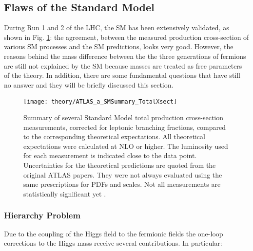 		\subsection{Flaws of the Standard Model}
		\label{sec:SMlim}

			During Run 1 and 2 of the LHC, the SM has been extensively validated, as shown in Fig. \ref{fig:ATLAS_a_SMSummary_TotalXsect}: the agreement, between the measured production cross-section of various SM processes and the SM predictions, looks very good. However, the reasons behind the mass difference between the the three generations of fermions are still not explained by the SM because masses are treated as free parameters of the theory. In addition, there are some fundamental questions that have still no answer and they will be briefly discussed this section.

			\begin{figure}[!htb]
				\centering
				\texttt{[image: theory/ATLAS\_a\_SMSummary\_TotalXsect]}
				\caption{\label{fig:ATLAS_a_SMSummary_TotalXsect} Summary of several Standard Model total production cross-section measurements, corrected for leptonic branching fractions, compared to the corresponding theoretical expectations. All theoretical expectations were calculated at NLO or higher. The luminosity used for each measurement is indicated close to the data point. Uncertainties for the theoretical predictions are quoted from the original ATLAS papers. They were not always evaluated using the same prescriptions for PDFs and scales. Not all measurements are statistically significant yet \cite{ATLAS_a_SMSummary_TotalXsect}.}
			\end{figure}



		\subsubsection*{Hierarchy Problem}

			Due to the coupling of the Higgs field to the fermionic fields the one-loop corrections to the Higgs mass receive several contributions. In particular: 


